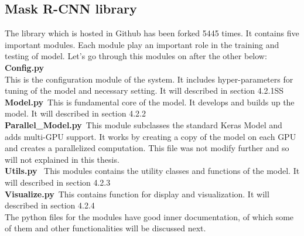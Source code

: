 \subsection{Mask R-CNN library}
The library which is hosted in Github has been forked 5445 times. It contains five important modules. Each module play an important role in the training and testing of model. Let’s go through this modules on after the other below:
\\
\textbf{Config.py}
\\
This is the configuration module of the system. It includes hyper-parameters for tuning of the model and necessary setting. It will described in section 4.2.1SS
\\
\textbf{Model.py}\
This is fundamental core of the model. It develops and builds up the model. It will described in section 4.2.2
\\	
\textbf{Parallel\_Model.py}\ 
This module subclasses the standard Keras Model and adds multi-GPU support. It works by creating a copy of the model on each GPU and creates a parallelized computation.
This file was not modify further and so will not explained in this thesis.
\\
\textbf{Utils.py} \
This modules contains the utility classes and functions of the model. It will described in section 4.2.3
\\
\textbf{Visualize.py}\
This contains function for display and visualization. It will described in section 4.2.4
\\

The python files for the modules have good inner documentation, of which some of them and other functionalities will be discussed next.

